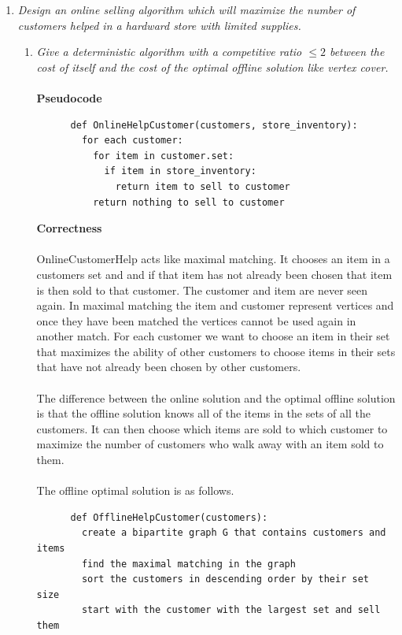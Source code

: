 \documentclass[12pt]{article}
\begin{document}
\begin{enumerate}
  \item \textit{Design an online selling algorithm which will maximize the
  number of customers helped in a hardward store with limited supplies.}
    \begin{enumerate}
      \item \textit{Give a deterministic algorithm with a competitive ratio
      $\le 2$ between the cost of itself and the cost of the optimal offline
      solution like vertex cover.}\\
      \\
      \textbf{Pseudocode}
      \begin{verbatim}
      def OnlineHelpCustomer(customers, store_inventory):
        for each customer:
          for item in customer.set:
            if item in store_inventory:
              return item to sell to customer
          return nothing to sell to customer
      \end{verbatim}
      \textbf{Correctness}\\
      \\
      OnlineCustomerHelp acts like maximal matching.  It chooses
      an item in a customers set and and if that item has not already been
      chosen that item is then sold to that customer.  The customer and item are
      never seen again. In maximal matching the item and customer represent
      vertices and once they have been matched the vertices cannot be used again
      in another match.  For each customer we want to choose an item in their
      set that maximizes the ability of other customers to choose items in
      their sets that have not already been chosen by other customers.\\
      \\
      The difference between the online solution and the optimal offline
      solution is that the offline solution knows all of the items in the sets
      of all the customers.  It can then choose which items are sold to which
      customer to maximize the number of customers who walk away with an item sold to them.\\
      \\
      The offline optimal solution is as follows.  
      \begin{verbatim}
      def OfflineHelpCustomer(customers):
        create a bipartite graph G that contains customers and items
        find the maximal matching in the graph
        sort the customers in descending order by their set size
        start with the customer with the largest set and sell them 

\end{verbatim}
\end{enumerate}
\end{enumerate}
\end{document}
